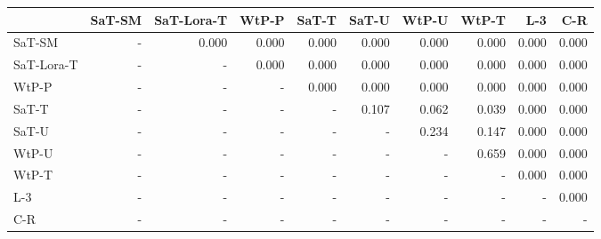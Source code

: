 \begin{tabular}{lrrrrrrrrr}
\toprule
 & SaT-SM & SaT-Lora-T & WtP-P & SaT-T & SaT-U & WtP-U & WtP-T & L-3 & C-R \\
\midrule
SaT-SM & - & 0.000 & 0.000 & 0.000 & 0.000 & 0.000 & 0.000 & 0.000 & 0.000 \\
SaT-Lora-T & - & - & 0.000 & 0.000 & 0.000 & 0.000 & 0.000 & 0.000 & 0.000 \\
WtP-P & - & - & - & 0.000 & 0.000 & 0.000 & 0.000 & 0.000 & 0.000 \\
SaT-T & - & - & - & - & 0.107 & 0.062 & 0.039 & 0.000 & 0.000 \\
SaT-U & - & - & - & - & - & 0.234 & 0.147 & 0.000 & 0.000 \\
WtP-U & - & - & - & - & - & - & 0.659 & 0.000 & 0.000 \\
WtP-T & - & - & - & - & - & - & - & 0.000 & 0.000 \\
L-3 & - & - & - & - & - & - & - & - & 0.000 \\
C-R & - & - & - & - & - & - & - & - & - \\
\bottomrule
\end{tabular}

